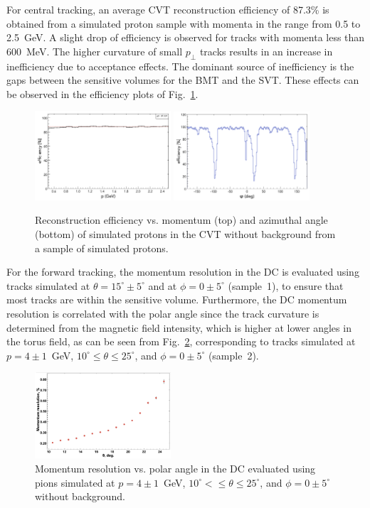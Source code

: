 For central tracking, an average CVT reconstruction efficiency of 87.3\% is obtained from a simulated proton sample
with momenta in the range from 0.5 to 2.5~GeV. A slight drop of efficiency is observed for tracks with momenta less
than 600~MeV. The higher curvature of small $p_\perp$ tracks results in an increase in inefficiency due to acceptance
effects. The dominant source of inefficiency is the gaps between the sensitive volumes for the BMT and the SVT.
These effects can be observed in the efficiency plots of Fig.~\ref{fig:cvtpeff}.

\begin{figure}[h]
\includegraphics[width=0.45\textwidth]{pics/CVTPEff.png}
\includegraphics[width=0.45\textwidth]{pics/CVTPhiEff.png}
\caption{Reconstruction efficiency vs. momentum (top) and azimuthal angle (bottom) of simulated protons in the CVT
  without background from a sample of simulated protons.}
\label{fig:cvtpeff}
\end{figure}

For the forward tracking, the momentum resolution in the DC is evaluated using tracks simulated at
$\theta =15^\circ \pm 5^\circ$ and at $\phi = 0 \pm 5^\circ$ (sample~1), to ensure that most tracks are within the
sensitive volume. Furthermore, the DC momentum resolution is correlated with the polar angle since the track
curvature is determined from the magnetic field intensity, which is higher at lower angles in the torus field, as can
be seen from Fig.~\ref{fig:restheta}, corresponding to tracks simulated at $p=4\pm 1$~GeV,
$10^\circ \leq \theta \leq 25^\circ$, and $\phi = 0 \pm 5^\circ$ (sample~2).

\begin{figure}
\includegraphics[width=0.45\textwidth]{pics/DCRes2.png}
\caption{Momentum resolution vs. polar angle in the DC evaluated using pions simulated at $p=4\pm 1$~GeV,
  $10^\circ <\leq \theta \leq 25^\circ$, and $\phi = 0 \pm 5^\circ$ without background.}
\label{fig:restheta}
\end{figure}

